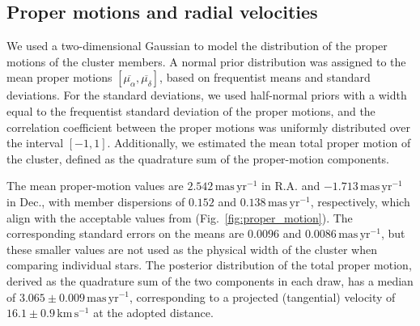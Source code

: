 \documentclass{aa}
\begin{document}
\subsection{Proper motions and radial velocities}\label{subsec:pmrv}
We used a two-dimensional Gaussian to model the distribution of the proper motions of the cluster members. A normal prior distribution was assigned to the mean proper motions $\left[\overline{\mu_\alpha},\overline{\mu_\delta}\right]$, based on frequentist means and standard deviations. For the standard deviations, we used half-normal priors with a width equal to the frequentist standard deviation of the proper motions, and the correlation coefficient between the proper motions was uniformly distributed over the interval $[-1, 1]$. Additionally, we estimated the mean total proper motion of the cluster, defined as the quadrature sum of the proper-motion components.

The mean proper-motion values are $2.542\,\mathrm{mas\,yr^{-1}}$ in R.A. and $-1.713\,\mathrm{mas\,yr^{-1}}$ in Dec., with member dispersions of $0.152$ and $0.138\,\mathrm{mas\,yr^{-1}}$, respectively, which align with the acceptable values from \citet{2023MNRAS.526.4107P} (Fig.~\ref{fig:proper_motion}). The corresponding standard errors on the means are $0.0096$ and $0.0086\,\mathrm{mas\,yr^{-1}}$, but these smaller values are not used as the physical width of the cluster when comparing individual stars. The posterior distribution of the total proper motion, derived as the quadrature sum of the two components in each draw, has a median of $3.065 \pm 0.009\,\mathrm{mas\,yr^{-1}}$, corresponding to a projected (tangential) velocity of $16.1 \pm 0.9\,\mathrm{km\,s^{-1}}$ at the adopted distance.
\end{document}
